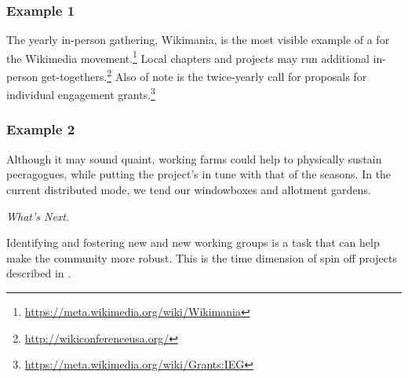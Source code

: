 \subsubsection*{Example 1} The yearly in-person gathering, Wikimania, is the most visible
example of a  for the Wikimedia movement.\footnote{\url{https://meta.wikimedia.org/wiki/Wikimania}}
Local chapters and projects may run additional in-person get-togethers.\footnote{\url{http://wikiconferenceusa.org/}}
Also of note is the twice-yearly call for proposals for individual
engagement grants.\footnote{\url{https://meta.wikimedia.org/wiki/Grants:IEG}}

\subsubsection*{Example 2} Although it may sound quaint, working farms could help to physically
sustain peeragogues, while putting the project's  in tune with that of the seasons.  In the
current distributed mode, we tend our windowboxes and allotment gardens.

\begin{framed}
\noindent 
\emph{What's Next.}
\begin{collectinmacro}{\HeartbeatWN}{}{}
Identifying and fostering new  and new working groups is a task that can help make the community more robust.  This is the time dimension of spin off projects described in .
\end{collectinmacro}
\HeartbeatWN
\end{framed}


